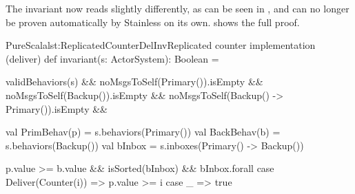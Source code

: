 The invariant now reads slightly differently, as can be seen in , and can no longer be proven automatically by Stainless on its own.  shows the full proof.

\begin{Code}{PureScala}{lst:ReplicatedCounterDelInv}{Replicated counter implementation (deliver)}
def invariant(s: ActorSystem): Boolean = {
  validBehaviors(s)                           &&
  noMsgsToSelf(Primary()).isEmpty             &&
  noMsgsToSelf(Backup()).isEmpty              &&
  noMsgsToSelf(Backup() -> Primary()).isEmpty && {
    val PrimBehav(p) = s.behaviors(Primary())
    val BackBehav(b) = s.behaviors(Backup())
    val bInbox       = s.inboxes(Primary() -> Backup())

    p.value >= b.value && isSorted(bInbox) && bInbox.forall {
      case Deliver(Counter(i)) => p.value >= i
      case _                   => true
    }
  }
}
\end{Code}


